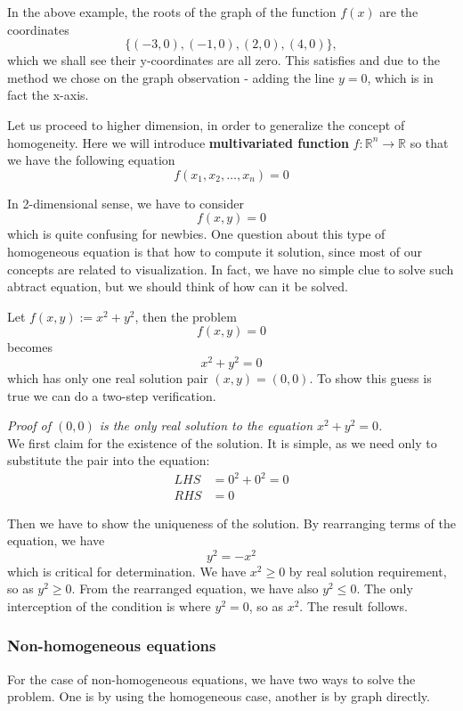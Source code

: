 \documentclass[12pt]{article}
\renewenvironment{proof}[1][Proof]{\begin{snugshade*} \textit{{#1}.}\\}{\hfill \qedsymbol \end{snugshade*}}
\begin{document}
    In the above example, the roots of the graph of the function $f(x)$ are the coordinates $$\{(-3,0), (-1,0), (2,0), (4,0)\},$$ which we shall see their y-coordinates are all zero. This satisfies and due to the method we chose on the graph observation - adding the line $y=0$, which is in fact the x-axis.

    Let us proceed to higher dimension, in order to generalize the concept of homogeneity. Here we will introduce \textbf{multivariated function} $f:\mathbb{R}^n\to \mathbb{R}$ so that we have the following equation \[f(x_1,x_2,\dots ,x_n)=0\]

    In 2-dimensional sense, we have to consider \[f(x,y)=0\] which is quite confusing for newbies. One question about this type of homogeneous equation is that how to compute it solution, since most of our concepts are related to visualization. In fact, we have no simple clue to solve such abtract equation, but we should think of how can it be solved.

    Let $f(x,y):=x^2+y^2$, then the problem \[f(x,y)=0\] becomes \[x^2+y^2=0\] which has only one real solution pair $(x,y)=(0,0)$. To show this guess is true we can do a two-step verification.

    \begin{proof}[Proof of $(0,0)$ is the only real solution to the equation $x^2+y^2=0$]
        We first claim for the existence of the solution. It is simple, as we need only to substitute the pair into the equation:\begin{align*}
            LHS &= 0^2+0^2=0\\
            RHS &= 0
        \end{align*}

        Then we have to show the uniqueness of the solution. By rearranging terms of the equation, we have \[y^2=-x^2\] which is critical for determination. We have $x^2\geq 0$ by real solution requirement, so as $y^2\geq 0$. From the rearranged equation, we have also $y^2\leq 0$. The only interception of the condition is where $y^2=0$, so as $x^2$. The result follows.
    \end{proof}

    \subsubsection*{Non-homogeneous equations}

    For the case of non-homogeneous equations, we have two ways to solve the problem. One is by using the homogeneous case, another is by graph directly.
\end{document}
